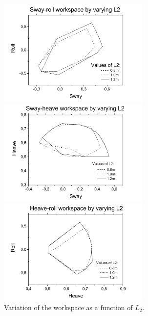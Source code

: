\documentclass[10.5pt, twocolumn]{article}
\begin{document}
\begin{figure}
\centering
\begin{minipage}{0.49\textwidth}
	\includegraphics[width=7.5cm]{Images/ws_l2_xa}
\end{minipage}
\begin{minipage}{0.49\textwidth}
	\includegraphics[width=7.5cm]{Images/ws_l2_xy}
\end{minipage}
\begin{minipage}{0.49\textwidth}
	\includegraphics[width=7.5cm]{Images/ws_l2_ya}
\end{minipage}
    \caption{Variation of the workspace as a function of \( L_2 \).}
    \label{fig:ws_3}
\end{figure}
\end{document}
